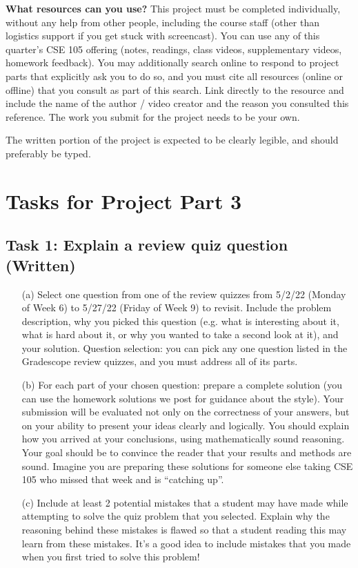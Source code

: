 \documentclass[12pt, oneside]{article}
\begin{document}
 {\bf What resources can you use? }
 This project must be completed individually, without any help from other people, 
 including the course staff (other than logistics support if you get stuck with screencast). 
 You can use any of this quarter’s CSE 105 offering (notes, readings, class videos, 
 supplementary videos, homework feedback). You may additionally search online to respond to 
 project parts that explicitly ask you to do so, and you must  cite all resources (online or offline) 
 that you consult as part of this search. Link directly to the resource and include the name of the 
 author / video creator and the reason you consulted this reference. The work you submit for the 
 project needs to be your own. 
 
The written portion of the project is expected to be clearly legible, and should preferably be typed.

 \newpage
 \section*{Tasks for Project Part 3}

 \subsection*{Task 1: Explain a review quiz question (Written)}
	
	\begin{enumerate}
		\item[(a)] Select one question from one of the review quizzes from 5/2/22 (Monday of Week 6) to 5/27/22  (Friday of Week 9) to revisit.
		Include the problem description, why you picked this question (e.g. what is interesting about it, what is hard about it, 
		or why you wanted to take a second look at it), and your solution. Question selection: 
		you can pick any one question listed in the Gradescope review quizzes, and you must address 
		all  of its parts. 
 		\item[(b)] For each part of your chosen question: prepare a complete solution 
		 (you can use the homework solutions we post for guidance about the style). 
		 Your submission will be evaluated not only on the correctness of your answers, 
		 but on your ability to present your ideas clearly and logically. You should explain how you arrived at your conclusions, 
		 using mathematically sound reasoning. Your goal should be to convince the reader that your results and 
		 methods are sound. Imagine you are preparing these solutions for someone else taking 
		 CSE 105 who missed that week and is “catching up”.
 
 		\item[(c)] Include at least 2 potential mistakes that a student may have made while attempting to solve the quiz 
		 problem that you selected. Explain why the reasoning behind these mistakes is flawed so that 
		 a student reading this may learn from these mistakes. It's a good idea to include mistakes that you made 
		 when you first tried to solve this problem!	
	\end{enumerate}
	
\end{document}
